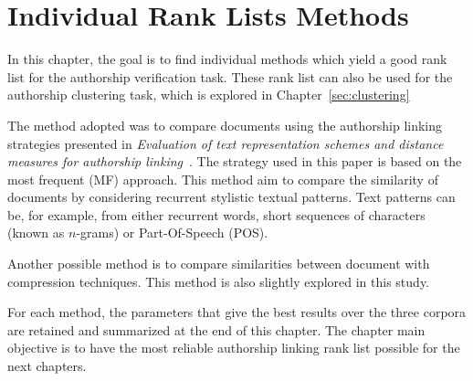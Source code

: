 \chapter{Individual Rank Lists Methods \label{sec:individual_methods}}

In this chapter, the goal is to find individual methods which yield a good rank list for the authorship verification task.
These rank list can also be used for the authorship clustering task, which is explored in Chapter~\ref{sec:clustering}

The method adopted was to compare documents using the authorship linking strategies presented in \textit{Evaluation of text representation schemes and distance measures for authorship linking}~\cite{kocher_verification}.
The strategy used in this paper is based on the most frequent (MF) approach.
This method aim to compare the similarity of documents by considering recurrent stylistic textual patterns.
Text patterns can be, for example, from either recurrent words, short sequences of characters (known as $n$-grams) or Part-Of-Speech (POS).

Another possible method is to compare similarities between document with compression techniques.
This method is also slightly explored in this study.

For each method, the parameters that give the best results over the three corpora are retained and summarized at the end of this chapter.
The chapter main objective is to have the most reliable authorship linking rank list possible for the next chapters.







